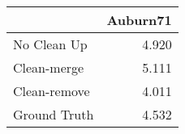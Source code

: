 \begin{tabular}{lr}
\toprule
{} & Auburn71 \\
\midrule
No Clean Up  &    4.920 \\
Clean-merge  &    5.111 \\
Clean-remove &    4.011 \\
Ground Truth &    4.532 \\
\bottomrule
\end{tabular}
